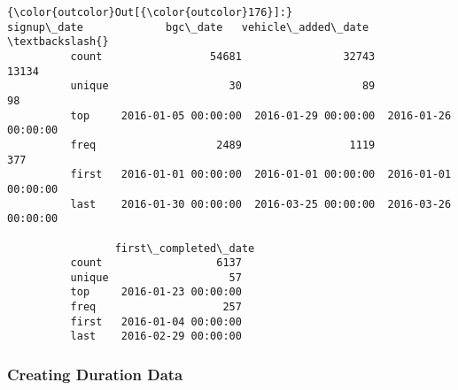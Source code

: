 \documentclass[11pt]{article}
\begin{document}
\begin{Verbatim}[commandchars=\\\{\}]
{\color{outcolor}Out[{\color{outcolor}176}]:}                 signup\_date             bgc\_date   vehicle\_added\_date  \textbackslash{}
          count                 54681                32743                13134   
          unique                   30                   89                   98   
          top     2016-01-05 00:00:00  2016-01-29 00:00:00  2016-01-26 00:00:00   
          freq                   2489                 1119                  377   
          first   2016-01-01 00:00:00  2016-01-01 00:00:00  2016-01-01 00:00:00   
          last    2016-01-30 00:00:00  2016-03-25 00:00:00  2016-03-26 00:00:00   
          
                 first\_completed\_date  
          count                  6137  
          unique                   57  
          top     2016-01-23 00:00:00  
          freq                    257  
          first   2016-01-04 00:00:00  
          last    2016-02-29 00:00:00  
\end{Verbatim}
            
    \subsubsection{Creating Duration Data}\label{creating-duration-data}
\end{document}
